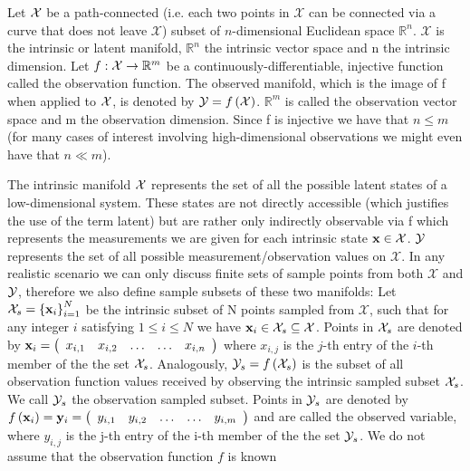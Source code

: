 	Let ${\cal X}$ be a path-connected (i.e. each two points in $\mathcal{X}$ can be connected via a curve that does not leave $\mathcal{X}$) subset of $n$-dimensional Euclidean space $\mathbb{R}^{n}$. $\mathcal{X}$ is the intrinsic or latent manifold, $\mathbb{R}^{n}$ the intrinsic vector space and n the intrinsic dimension. Let $f:{\cal X}\rightarrow\mathbb{R}^{m}$ be a continuously-differentiable, injective function called the observation function. The observed manifold, which is the image of f when applied to ${\cal X}$, is denoted by ${\cal Y}=f\left({\cal X}\right)$. $\mathbb{R}^{m}$ is called the observation vector space and m the observation dimension. Since f is injective we have that $n \leq m$ (for many cases of interest involving high-dimensional observations we might even have that $n\ll m$).
		
	The intrinsic manifold ${\cal X}$ represents the set of all the possible latent states of a low-dimensional system. These states are not directly accessible (which justifies the use of the term latent) but are rather only indirectly observable via f which represents the measurements we are given for each intrinsic state ${\bf x}\in{\cal X}$. ${\cal Y}$ represents the set of all possible measurement/observation values on $\mathcal{X}$. In any realistic scenario we can only discuss finite sets of sample points from both $\mathcal{X}$ and ${\cal Y}$, therefore we also define sample subsets of these two manifolds: Let ${\cal X}_{s}=\left\{ {\bf x}_{i}\right\} _{i=1}^{N}$ be the intrinsic subset of N points sampled from $\mathcal{X}$, such that for any integer $i$ satisfying $1\leq i\leq N$ we have ${\bf x}_{i}\in{\cal X}_{s}\subseteq{\cal X}$. Points in ${\cal X}_{s}$ are denoted by ${\bf x}_{i}=\left(\begin{array}{ccccc} x_{i,1} & x_{i,2} & \ldots & \ldots & x_{i,n}\end{array}\right)$ where $x_{i,j}$ is the $j$-th entry of the $i$-th member of the the set ${\cal X}_{s}$. Analogously, ${\cal Y}_{s}=f\left({\cal X}_{s}\right)$ is the subset of all observation function values received by observing the intrinsic sampled subset ${\cal X}_{s}$. We call ${\cal Y}_{s}$ the observation sampled subset. Points in ${\cal Y}_{s}$ are denoted by $f\left(\mathbf{x}_{i}\right)={\bf y}_{i}=\left(\begin{array}{ccccc} y_{i,1} & y_{i,2} & \ldots & \ldots & y_{i,m}\end{array}\right)$ and are called the observed variable, where $y_{i,j}$ is the j-th entry of the i-th member of the the set ${\cal Y}_{s}$. We do not assume that the observation function $f$ is known
		
